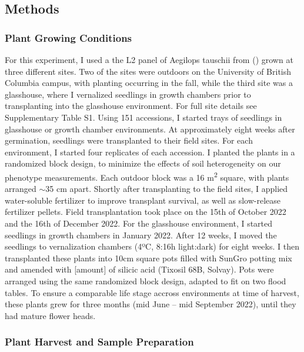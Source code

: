 \documentclass[12pt, letterpaper, ]{article}
\begin{document}
\subsection{Methods}

\subsubsection{Plant Growing Conditions}

For this experiment, I used a the L2 panel of Aegilops tauschii from (\cite{gaurav_population_2021}) grown at three different sites. Two of the sites were outdoors on the University of British Columbia campus, with planting occurring in the fall, while the third site was a glasshouse, where I vernalized seedlings in growth chambers prior to transplanting into the glasshouse environment. For full site details see Supplementary Table S1. Using 151 accessions, I started trays of seedlings in glasshouse or growth chamber environments. At approximately eight weeks after germination, seedlings were transplanted to their field sites. For each environment, I started four replicates of each accession. I planted the plants in a randomized block design, to minimize the effects of soil heterogeneity on our phenotype measurements. Each outdoor block was a 16 m\textsuperscript{2} square, with plants arranged $\sim$35 cm apart. Shortly after transplanting to the field sites, I applied water-soluble fertilizer to improve transplant survival, as well as slow-release fertilizer pellets. Field transplantation took place on the 15th of October 2022 and the 16th of December 2022. For the glasshouse environment, I started seedlings in growth chambers in January 2022. After 12 weeks, I moved the seedlings to vernalization chambers (4ºC, 8:16h light:dark) for eight weeks. I then transplanted these plants into 10cm square pots filled with SunGro potting mix and amended with [amount] of silicic acid (Tixosil 68B, Solvay). Pots were arranged using the same randomized block design, adapted to fit on two flood tables. To ensure a comparable life stage accross environments at time of harvest, these plants grew for three months (mid June – mid September 2022), until they had mature flower heads. 

\subsubsection{Plant Harvest and Sample Preparation}
\end{document}
